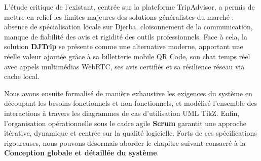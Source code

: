 \documentclass[12pt,a4paper]{report}
\begin{document}
L’étude critique de l’existant, centrée sur la plateforme TripAdvisor, a permis de mettre en relief les limites majeures des solutions généralistes du marché : absence de spécialisation locale sur Djerba, cloisonnement de la communication, manque de fiabilité des avis et rigidité des outils professionnels. Face à cela, la solution \textbf{DJTrip} se présente comme une alternative moderne, apportant une réelle valeur ajoutée grâce à sa billetterie mobile QR Code, son chat temps réel avec appels multimédias WebRTC, ses avis certifiés et sa résilience réseau via cache local.

Nous avons ensuite formalisé de manière exhaustive les exigences du système en découpant les besoins fonctionnels et non fonctionnels, et modélisé l'ensemble des interactions à travers les diagrammes de cas d'utilisation UML TikZ. Enfin, l'organisation opérationnelle sous le cadre agile \textbf{Scrum} garantit une approche itérative, dynamique et centrée sur la qualité logicielle. Forts de ces spécifications rigoureuses, nous pouvons désormais aborder le chapitre suivant consacré à la \textbf{Conception globale et détaillée du système}.
\end{document}
